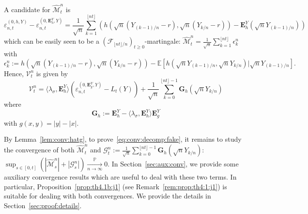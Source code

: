 \documentclass[12pt]{article}
\numberwithin{equation}{section}
\theoremstyle{definition}
\theoremstyle{remark}
\newcommand{\convp}[1][]{\xrightarrow[#1]{\PP}}
\newcommand{\PP}{\mathbb{P}}
\newcommand{\EE}{\mathbb{E}}
\newcommand{\cF}{\mathcal{F}}
\newcommand{\cG}{\mathcal{G}}
\newcommand{\bfH}[1]{\mathbf{E}^Y_{#1}}
\newcommand{\bfG}[1]{\mathbf{G}_{#1}}
\begin{document}
%
A candidate for $\widehat{\mathcal{M}}^n_t$ is 
\begin{equation}
	\varepsilon_{n,t}^{(0,h,Y)} - \varepsilon_{n,t}^{(0,\bfH{h},Y)}
	= 
	\frac{1}{\sqrt{n}} \sum_{k=1}^{\lfloor n t \rfloor} 
	\left( h(\sqrt{n}(Y_{(k-1)/n}-r),\sqrt{n}(Y_{k/n}-r)) 
		- \bfH{h} (\sqrt{n}Y_{(k-1)/n}) \right)
\end{equation}
which can be easily seen to be a $(\cF_{\lfloor n t \rfloor/n})_{t\geq 0}$-martingale: 
$	
	\widehat{\mathcal{M}}^n_t = \frac{1}{\sqrt{n}} \sum_{k=1}^{\lfloor n t \rfloor} \epsilon^n_k
$
with
\begin{equation}
	\epsilon^n_k
	:=	%
h(\sqrt{n}(Y_{(k-1)/n}-r),\sqrt{n}(Y_{k/n}-r)) 
			- \EE\!\left[h(\sqrt{n}Y_{(k-1)/n},\sqrt{n}Y_{k/n}) | \sqrt{n}Y_{(k-1)/n}\right].
\end{equation}
Hence, $\mathcal{V}^n_t$ is given by
\begin{equation}
	\mathcal{V}^n_t = \langle \lambda_\sigma , \bfH h \rangle \left( 
\varepsilon_{n,t}^{(0,\bfH{g},Y)} %
-L_t(Y) \right)
	+  \frac1{\sqrt{n}}\sum_{k=0}^{\lfloor n t \rfloor-1} \bfG{h} (\sqrt{n}Y_{k/n})
\end{equation}
where
\begin{equation} \label{eq:kappa}
	\bfG{h} := \bfH {h} - \langle \lambda_\sigma , \bfH h \rangle \bfH{g}
\end{equation}
with
$
	g(x,y) = |y| - |x|.
$

By Lemma~\ref{lem:conv:hatg}, to prove~\eqref{eq:conv:decomp:fake}, it remains to study the convergence of both $\widehat{\mathcal{M}}^n_t$
and $\cG^n_t:=\frac1{\sqrt{n}}\sum_{k=0}^{\lfloor n t \rfloor-1} \bfG{h} (\sqrt{n}Y_{k/n})$: 
$\sup_{s\in [0,t]} (|\widehat{\mathcal{M}}^n_s| + |\cG^n_s|) \convp[n\to\infty] 0$.
%
In Section~\ref{sec:aux:conv}, we provide some auxiliary convergence results which are useful to deal with these two terms.
%
In particular, Proposition~\ref{prop:th4.1b:j1} (see Remark~\ref{rem:prop:th4:1:j1}) is suitable for dealing with both convergences. 
We provide the details in Section~\ref{sec:proof:details}.
\end{document}
